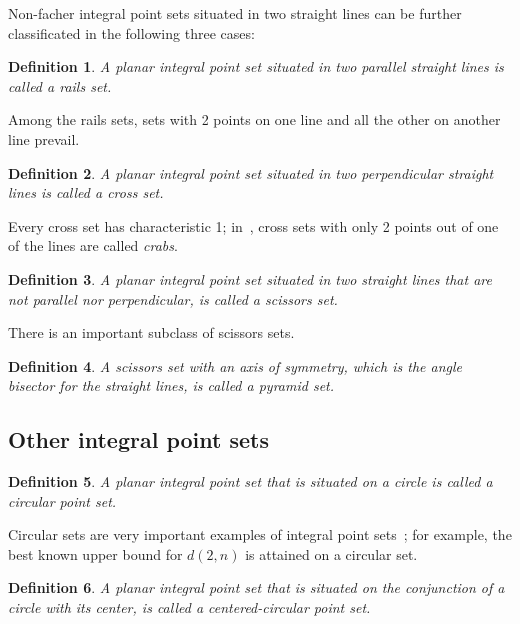 \documentclass[12pt]{article}
\theoremstyle{theorem}
\theoremstyle{dfn}
\newtheorem{dfn}{Definition}
\theoremstyle{remark}
\begin{document}
Non-facher integral point sets situated in two straight lines
can be further classificated in the following three cases:

\begin{dfn}
	A planar integral point set situated in two parallel straight lines
	is called a \textit{rails} set.
\end{dfn}

Among the rails sets, sets with 2 points on one line and all the other on another line prevail.

\begin{dfn}
	A planar integral point set situated in two perpendicular straight lines
	is called a \textit{cross} set.
\end{dfn}
Every cross set has characteristic 1;
in~\cite{antonov2008maximal}, cross sets with only 2 points out of one of the lines are called \textit{crabs}.

\begin{dfn}
	A planar integral point set situated in two straight lines
	that are not parallel nor perpendicular,
	is called a \textit{scissors} set.
\end{dfn}

There is an important subclass of scissors sets.

\begin{dfn}
	A scissors set with an axis of symmetry,
	which is the angle bisector for the straight lines,
	is called a \textit{pyramid} set.
\end{dfn}



\subsection{Other integral point sets}

\begin{dfn}
	A planar integral point set that is situated on a circle is called a \textit{circular}
	point set.
\end{dfn}

Circular sets are very important examples
of integral point sets~\cite{harborth1993upper,piepmeyer1996maximum,bat2018number};
for example, the best known upper bound for $d(2,n)$
is attained on a circular set.


\begin{dfn}
	A planar integral point set that is situated on the conjunction of a circle with its center,
	is called a \textit{centered-circular} point set.
\end{dfn}
\end{document}
